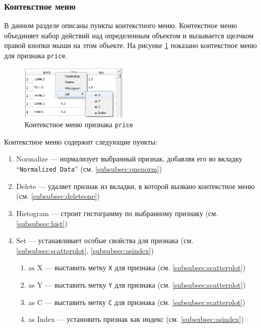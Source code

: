 \documentclass[12pt]{instruction}
\begin{document}
\subsubsection{Контекстное меню}
В данном разделе описаны пункты контекстного меню. Контекстное меню объединяет набор действий над определенным объектом и вызывается щелчком правой кнопки мыши на этом объекте. На рисунке \ref{fig:contextmenu} показано контекстное меню для признака \texttt{price}.

\begin{figure}[t!]
	\centering
	\includegraphics[width=0.45\textwidth]{img/contextmenufeature}
	\caption{Контекстное меню признака \texttt{price}}
	\label{fig:contextmenu}
\end{figure}

\newpage
Контекстное меню содержит следующие пункты:
\begin{enumerate}
	\item Normalize --- нормализует выбранный признак, добавляя его во вкладку 	``\texttt{Normalized Data}'' (см. \ref{subsubsec:onenorm})
	\item Delete --- удаляет признак из вкладки, в которой вызвано контекстное меню (см. \ref{subsubsec:deleteone})
	\item Histogram --- строит гистограмму по выбранному признаку (см. \ref{subsubsec:hist})
	\item Set --- устанавливает особые свойства для признака (см. \ref{subsubsec:scatterplot}, \ref{subsubsec:asindex})
	\begin{enumerate}
		\item as X --- выставить метку \texttt{X} для признака (см. \ref{subsubsec:scatterplot})
		\item as Y --- выставить метку \texttt{Y} для признака (см. \ref{subsubsec:scatterplot})
		\item as C --- выставить метку \texttt{C} для признака (см. \ref{subsubsec:scatterplot})
		\item as Index --- установить признак как индекс (см. \ref{subsubsec:asindex})
	\end{enumerate}
\end{enumerate}
\end{document}
